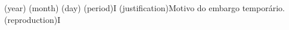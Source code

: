 
\ulfmvdocemxadate(year){}
\ulfmvdocemxadate(month){}
\ulfmvdocemxadate(day){}
\ulfmvavailability(period){I}%
\ulfmvavailability(justification){Motivo do embargo temporário.}
\ulfmvavailability(reproduction){I}%
